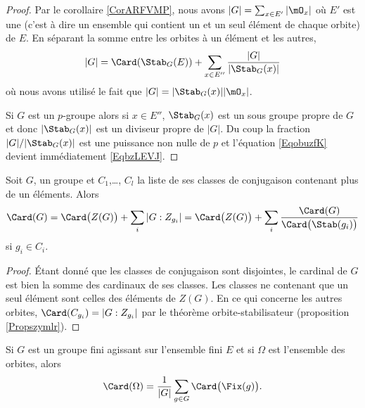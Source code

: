 \begin{proof}
    Par le corollaire \ref{CorARFVMP}, nous avons \( | G |=\sum_{x\in E'}| \mO_x |\) où \( E'\) est une  (c'est à dire un ensemble qui contient un et un seul élément de chaque orbite) de \( E\). En séparant la somme entre les orbites à un élément et les autres,
    \begin{equation}    \label{EqeggkBs}
        | G |=\Card(\Stab_G(E))+\sum_{x\in E''}\frac{ | G | }{ | \Stab_G(x) | }
    \end{equation}  \label{EqDgYbhm}
    où nous avons utilisé le fait que \( | G |=| \Stab_G(x) | |\mO_x |\).

    Si \( G\) est un \( p\)-groupe alors si \( x\in E''\), \( \Stab_G(x)\) est un sous groupe propre de \( G\) et donc \( | \Stab_G(x) |\) est un diviseur propre de \( | G |\). Du coup la fraction \( | G |/|\Stab_G(x)|\) est une puissance non nulle de \( p\) et l'équation \eqref{EqobuzfK} devient immédiatement \eqref{EqbzLEVJ}.
\end{proof}
 

\begin{corollary}
    Soit \( G\), un groupe et \( C_1\),\ldots, \( C_l\) la liste de ses classes de conjugaison contenant plus de un éléments. Alors
    \begin{equation}        \label{EqkgGmoq}
        \Card(G)=\Card\big( Z(G) \big)+\sum_i| G:Z_{g_i} |=\Card\big( Z(G) \big)+\sum_i\frac{ \Card(G) }{ \Card\big( \Stab(g_i) \big) }
    \end{equation}
    si \( g_i\in C_i\).
\end{corollary}

\begin{proof}
    Étant donné que les classes de conjugaison sont disjointes, le cardinal de \( G\) est bien la somme des cardinaux de ses classes. Les classes ne contenant que un seul élément sont celles des éléments de \( Z(G)\). En ce qui concerne les autres orbites, \( \Card(C_{g_i})=| G:Z_{g_i} |\) par le théorème orbite-stabilisateur (proposition \ref{Propszymlr}).
\end{proof}

\begin{theorem}  
    Si \( G\) est un groupe fini agissant sur l'ensemble fini \( E\) et si \( \Omega\) est l'ensemble des orbites, alors
    \begin{equation}
        \Card(\Omega)=\frac{1}{ | G | }\sum_{g\in G}\Card\big( \Fix(g) \big).
    \end{equation}
\end{theorem}

